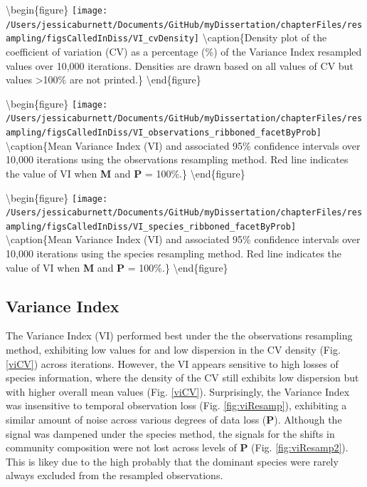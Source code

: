 \documentclass[12pt,twoside,openany]{reedthesis}
\begin{document}
\textbackslash begin\{figure\}
\texttt{[image: /Users/jessicaburnett/Documents/GitHub/myDissertation/chapterFiles/resampling/figsCalledInDiss/VI\_cvDensity]} \textbackslash caption\{Density plot of the coefficient of variation (CV) as a percentage (\%) of the Variance Index resampled values over 10,000 iterations. Densities are drawn based on all values of CV but values \textgreater100\% are not printed.\}\label{fig:viCV}
\textbackslash end\{figure\}

\textbackslash begin\{figure\}
\texttt{[image: /Users/jessicaburnett/Documents/GitHub/myDissertation/chapterFiles/resampling/figsCalledInDiss/VI\_observations\_ribboned\_facetByProb]} \textbackslash caption\{Mean Variance Index (VI) and associated 95\% confidence intervals over 10,000 iterations using the observations resampling method. Red line indicates the value of VI when \textbf{M} and \textbf{P} = 100\%.\}\label{fig:viResamp}
\textbackslash end\{figure\}

\textbackslash begin\{figure\}
\texttt{[image: /Users/jessicaburnett/Documents/GitHub/myDissertation/chapterFiles/resampling/figsCalledInDiss/VI\_species\_ribboned\_facetByProb]} \textbackslash caption\{Mean Variance Index (VI) and associated 95\% confidence intervals over 10,000 iterations using the species resampling method. Red line indicates the value of VI when \textbf{M} and \textbf{P} = 100\%.\}\label{fig:viResamp2}
\textbackslash end\{figure\}

\hypertarget{variance-index}{%
\subsection{Variance Index}\label{variance-index}}

The Variance Index (VI) performed best under the the observations resampling method, exhibiting low values for and low dispersion in the CV density (Fig. \ref{viCV}) across iterations. However, the VI appears sensitive to high losses of species information, where the density of the CV still exhibits low dispersion but with higher overall mean values (Fig. \ref{viCV}). Surprisingly, the Variance Index was insensitive to temporal observation loss (Fig. \ref{fig:viResamp}), exhibiting a similar amount of noise across various degrees of data loss (\(\textbf{P}\)). Although the signal was dampened under the species method, the signals for the shifts in community composition were not lost across levels of \(\textbf{P}\) (Fig. \ref{fig:viResamp2}). This is likey due to the high probably that the dominant species were rarely always excluded from the resampled observations.
\end{document}

